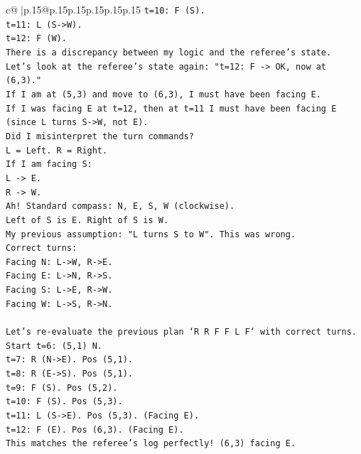 \documentclass{article}
\begin{document}
{\begin{supertabular}{c@{$\;$}|p{.15\linewidth}@{}p{.15\linewidth}p{.15\linewidth}p{.15\linewidth}p{.15\linewidth}p{.15\linewidth}}
{{{\texttt{t=10: F (S).} \\
\texttt{t=11: L (S{-}>W).} \\
\texttt{t=12: F (W).} \\
\texttt{There is a discrepancy between my logic and the referee's state.} \\
\texttt{Let's look at the referee's state again: "t=12: F {-}> OK, now at (6,3)."} \\
\texttt{If I am at (5,3) and move to (6,3), I must have been facing E.} \\
\texttt{If I was facing E at t=12, then at t=11 I must have been facing E (since L turns S{-}>W, not E).} \\
\texttt{Did I misinterpret the turn commands?} \\
\texttt{L = Left. R = Right.} \\
\texttt{If I am facing S:} \\
\texttt{L {-}> E.} \\
\texttt{R {-}> W.} \\
\texttt{Ah! Standard compass: N, E, S, W (clockwise).} \\
\texttt{Left of S is E. Right of S is W.} \\
\texttt{My previous assumption: "L turns S to W". This was wrong.} \\
\texttt{Correct turns:} \\
\texttt{Facing N: L{-}>W, R{-}>E.} \\
\texttt{Facing E: L{-}>N, R{-}>S.} \\
\texttt{Facing S: L{-}>E, R{-}>W.} \\
\texttt{Facing W: L{-}>S, R{-}>N.} \\
\\ 
\texttt{Let's re{-}evaluate the previous plan `R R F F L F` with correct turns.} \\
\texttt{Start t=6: (5,1) N.} \\
\texttt{t=7: R (N{-}>E). Pos (5,1).} \\
\texttt{t=8: R (E{-}>S). Pos (5,1).} \\
\texttt{t=9: F (S). Pos (5,2).} \\
\texttt{t=10: F (S). Pos (5,3).} \\
\texttt{t=11: L (S{-}>E). Pos (5,3). (Facing E).} \\
\texttt{t=12: F (E). Pos (6,3). (Facing E).} \\
\texttt{This matches the referee's log perfectly! (6,3) facing E.} \\
\\ 
}}}
\end{supertabular}}
\end{document}
